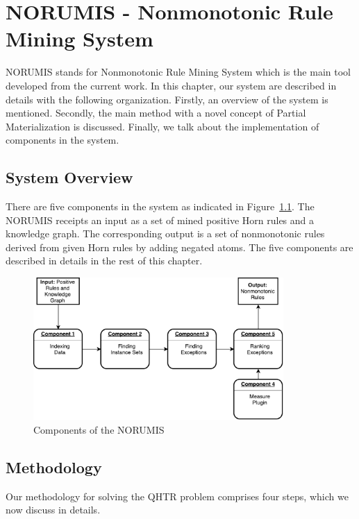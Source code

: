 \chapter{NORUMIS - Nonmonotonic Rule Mining System}\label{sec:meth}

NORUMIS stands for Nonmonotonic Rule Mining System which is the main tool developed from the current work. In this chapter, our system are described in details with the following organization. Firstly, an overview of the system is mentioned. Secondly, the main method with a novel concept of Partial Materialization is discussed. Finally, we talk about the implementation of components in the system.

\section{System Overview}

There are five components in the system as indicated in Figure~\ref{system_overview}. The NORUMIS receipts an input as a set of mined positive Horn rules and a knowledge graph. The corresponding output is a set of nonmonotonic rules derived from given Horn rules by adding negated atoms. The five components are described in details in the rest of this chapter.

\begin{figure}[ht]
\centering
\includegraphics[width=0.85\textwidth]{figures/system_overview}
\caption{Components of the NORUMIS}
\label{system_overview}
\end{figure}

\section{Methodology}

Our methodology for solving the QHTR problem comprises four steps, which we now discuss in details.
\medskip

